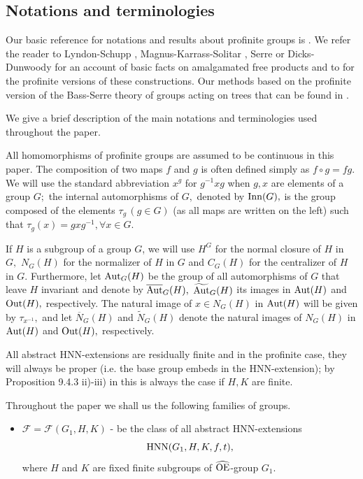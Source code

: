\documentclass[a4paper,12pt]{article}
\newcommand{\Oe}{\rm \widehat{OE}}
\def\aut {{\rm Aut}}
\def\out {{\rm Out}}
\def\inn {{\rm Inn}}
\def\hnn {{\rm HNN}}
\begin{document}
{\subsection{Notations and terminologies} 

Our basic reference for notations and results about profinite groups is \cite{RZ}. We refer the reader to Lyndon-Schupp \cite{LS}, Magnus-Karrass-Solitar \cite{MKS}, Serre \cite{S} or Dicks-Dunwoody \cite{DI} for an account of basic facts on amalgamated free products  and to \cite{RZ} for the profinite versions of these constructions. Our methods based on the profinite version of the Bass-Serre theory of groups acting on trees that can be found in \cite{R}. 

We  give a brief description of the main notations and terminologies used throughout the paper. 

All homomorphisms of profinite groups are assumed to be continuous in this paper. The composition of  two maps $f$ and $g$ is often defined simply as $f\circ g = fg.$ We will use the standard abbreviation $x^{g}$ for $g^{-1}xg$ when $g,x$ are elements of a group $G;$ the internal automorphisms of $G,$ denoted by $\inn(G),$ is the group composed of the elements $\tau_g\, (g \in G)$ (as all maps are written on the left) such that $\tau_g(x)=gxg^{-1}, \forall x \in G.$ 
 
If $H$ is a subgroup of a group $G$, we will use $H^G$ for the normal closure of $H$ in $G,$  $N_G(H)$ for the normalizer of $H$ in $G$ and $C_G(H)$ for the centralizer of $H$ in $G.$  Furthermore, let $\aut_G(H)$ be the group of all automorphisms of $G$ that leave $H$ invariant and denote by $\overline{\aut}_G(H),$ $\widetilde{\aut}_G(H)$ its images in $\aut(H)$ and $\out(H),$ respectively. The natural image of $x \in N_G(H)$ in $\aut(H)$ will be given by $\tau_{x^{-1}},$ and let $\overline{N}_G(H)$ and $\widetilde{N}_G(H)$ denote the natural images of $N_G(H)$ in $\aut(H)$ and $\out(H),$ respectively.

 All abstract HNN-extensions are residually finite and in the profinite case, they will always be proper (i.e. the base group  embeds in the HNN-extension);  by Proposition 9.4.3 ii)-iii) in \cite{RZ} this is always the case if  $H, K$ are finite.

Throughout the paper we shall us the following families of groups. 
\begin{itemize}

\item $\mathcal{F}=\mathcal F(G_1,H,K)$ - be the class of all 
abstract HNN-extensions $$\hnn(G_1, H, K, f, t),$$ where $H$ and $K$ are fixed finite subgroups of $\Oe$-group $G_1$. 


\end{itemize}}
\end{document}
